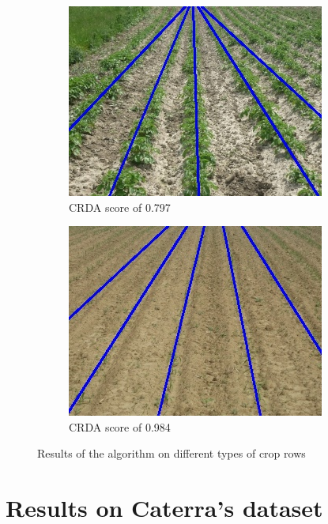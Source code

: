 \begin{figure}[H]
\begin{subfigure}{0.49\textwidth}
    \includegraphics[width=\textwidth]{Report/images/ransac008.jpg}
    \caption{CRDA score of 0.797}
    \label{fig:third}
\end{subfigure}
\begin{subfigure}{0.49\textwidth}%
    \includegraphics[width=\textwidth]{Report/images/ransac095.jpg}
    \caption{CRDA score of 0.984}
    \label{fig:third}
\end{subfigure}
\caption{Results of the algorithm on different types of crop rows}
\label{pics:resultsdiffcroprow}
\end{figure}

\section{Results on Caterra's dataset}

